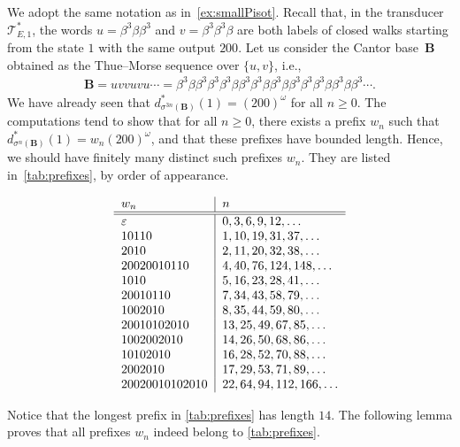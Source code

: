\documentclass[12pt,reqno]{amsart}
\newcommand{\B}{{\mathbf{B}}}
\begin{document}
We adopt the same notation as in~\cref{ex:smallPisot}. Recall that, in the transducer $\mathcal{T}^*_{E,1}$, the words $u=\beta^3\beta\beta^3$ and $v=\beta^3\beta^3\beta$ are both labels of closed walks starting from the state $1$ with the same output $200$. Let us consider the Cantor base~$\B$ obtained as the Thue--Morse sequence over $\{u,v\}$, i.e.,
\begin{align}
\B=uvvuvu\cdots=\beta^3\beta\beta^3 \beta^3 \beta^3 \beta  \beta^3 \beta^3\beta\beta^3 \beta \beta^3 \beta^3 \beta^3 \beta \beta^3 \beta \beta^3\cdots.\label{eq:tmmodif}
\end{align}
We have already seen that $d_{\sigma^{3n}(\B)}^*(1)=(200)^{\omega}$ for all $n\ge 0$. The computations tend to show that for all $n\ge 0$, there exists a prefix $w_n$ such that $d_{\sigma^n(\B)}^*(1)=w_n(200)^{\omega}$, and that these prefixes have bounded length. Hence, we should have finitely many distinct such prefixes $w_n$. They are listed in~\cref{tab:prefixes}, by order of appearance.
\begin{table}[ht]
\renewcommand{\arraystretch}{1.2} 
\[
\begin{tabular}{l|l}
    $w_n$ & $n$ \\ \hline \hline
    $\varepsilon$ & $0,3,6,9,12,\ldots$ \\
    $10110$ & $1, 10, 19, 31, 37,\ldots$  \\
    $2010$ & $2, 11, 20, 32, 38,\ldots$  \\
    $20020010110$ & $4, 40, 76, 124, 148,\ldots$ \\
    $1010$ & $5, 16, 23, 28, 41,\ldots$  \\
    $20010110$ & $7, 34, 43, 58, 79,\ldots$  \\
    $1002010$ & $8, 35, 44, 59, 80,\ldots$  \\
    $20010102010$ & $13, 25, 49, 67, 85,\ldots$ \\
    $1002002010$ & $14, 26, 50, 68, 86,\ldots$  \\
    $10102010$ & $16, 28, 52, 70, 88,\ldots$ \\
    $2002010$ & $17, 29, 53, 71, 89,\ldots$ \\
    $20020010102010$ & $22, 64, 94, 112, 166,\ldots$ \\
\end{tabular}
\]
\caption{Possible prefixes $w_n$ of $d_{\sigma^n(\B)}^{*}(1)=w_n(200)^{\omega}$.}
\label{tab:prefixes}
\renewcommand{\arraystretch}{1}
\end{table}

Notice that the longest prefix in \cref{tab:prefixes} has length $14$. The following lemma proves that all prefixes $w_n$ indeed belong to \cref{tab:prefixes}. 
\end{document}
